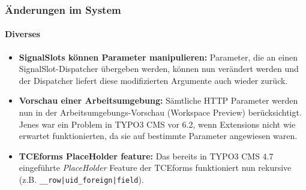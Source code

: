 \begin{frame}[fragile]
	\frametitle{Änderungen im System}
	\framesubtitle{Diverses}

	\begin{itemize}

		\item \textbf{SignalSlots können Parameter manipulieren:}\newline
			\small
				Parameter, die an einen SignalSlot-Dispatcher übergeben werden, können nun verändert werden und der Dispatcher liefert diese modifizierten Argumente auch wieder zurück.
			\normalsize

		\item \textbf{Vorschau einer Arbeitsumgebung:}\newline
			\small
				Sämtliche HTTP Parameter werden nun in der Arbeitsumgebungs-Vorschau (Workspace Preview) berücksichtigt. Jenes war ein Problem in TYPO3 CMS vor 6.2, wenn Extensions nicht wie erwartet funktionierten, da sie auf bestimmte Parameter angewiesen waren.
			\normalsize

		\item \textbf{TCEforms PlaceHolder feature:}\newline
			\small
				Das bereits in TYPO3 CMS 4.7 eingeführte \textit{PlaceHolder} Feature der TCEforms funktioniert nun rekursive (z.B. \texttt{\_\_row|uid\_foreign|field}).
			\normalsize

	\end{itemize}
	
\end{frame}


